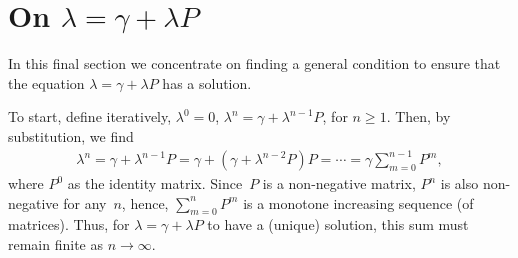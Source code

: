 \documentclass[queueing-book.tex]{subfiles}
\begin{document}
\section{On $\lambda = \gamma + \lambda P$}
\label{sec:lambda-=-gamma}

In this final section we concentrate on finding a general condition to ensure that the equation $\lambda = \gamma + \lambda P$ has a solution.


To start, define iteratively, $\lambda^0 = 0$, $\lambda^n = \gamma + \lambda^{n-1}P$, for $n\geq 1$.
Then, by substitution, we find
\begin{align*}
  \lambda^n = \gamma + \lambda^{n-1} P = \gamma + (\gamma + \lambda^{n-2}P) P = \cdots = \gamma \sum_{m=0}^{n-1} P^m,
\end{align*}
where $P^0$ as the identity matrix.
Since~$P$ is a non-negative matrix, $P^n$ is also non-negative for any~$n$, hence, $\sum_{m=0}^n P^m$ is a monotone increasing sequence (of matrices).
Thus, for $\lambda=\gamma + \lambda P$ to have a (unique) solution, this sum must remain finite as $n\to \infty$.
\end{document}
